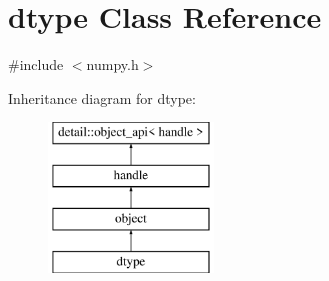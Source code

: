 \hypertarget{classdtype}{}\section{dtype Class Reference}
\label{classdtype}


{\ttfamily \#include $<$numpy.\+h$>$}

Inheritance diagram for dtype\+:\begin{figure}[H]
\begin{center}
\leavevmode
\includegraphics[height=4.000000cm]{classdtype}
\end{center}
\end{figure}
